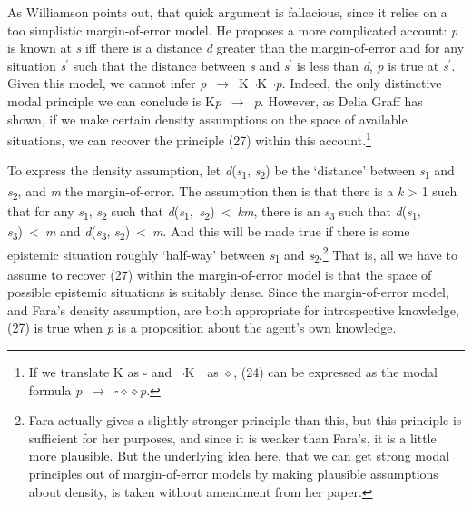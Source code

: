 As Williamson points out, that quick argument is fallacious, since it relies on a too simplistic margin-of-error model. He proposes a more complicated account: \textit{p} is known at \textit{s} iff there is a distance \textit{d} greater than the margin-of-error and for any situation \textit{s}\(^\prime\) such that the distance between \textit{s} and \textit{s}\(^\prime\) is less than \textit{d},\textit{ p} is true at \textit{s}\(^\prime\). Given this model, we cannot infer \textit{p}~${\rightarrow}$~K\(\neg\)K\(\neg\)\textit{p}. Indeed, the only distinctive modal principle we can conclude is K\textit{p}~${\rightarrow}$~\textit{p}. However, as Delia Graff \citet{Fara2002} has shown, if we make certain density assumptions on the space of available situations, we can recover the principle (27) within this account.\footnote{If we translate K as $\square $ and \(\neg\)K\(\neg\) as \(\diamond\), (24) can be expressed as the modal formula \textit{p}~${\rightarrow}$~$\square $\(\diamond\)\(\diamond\)\textit{p}.}


\noindent To express the density assumption, let \textit{d}(\textit{s}\textsubscript{1}, \textit{s}\textsubscript{2}) be the `distance' between \textit{s}\textsubscript{1} and \textit{s}\textsubscript{2}, and \textit{m} the margin-of-error. The assumption then is that there is a \textit{k} {\textgreater} 1 such that for any \textit{s}\textsubscript{1}, \textit{s}\textsubscript{2} such that \textit{d}(\textit{s}\textsubscript{1},~\textit{s}\textsubscript{2})~{\textless}~\textit{km}, there is an \textit{s}\textsubscript{3} such that \textit{d}(\textit{s}\textsubscript{1}, \textit{s}\textsubscript{3})~{\textless}~\textit{m} and \textit{d}(\textit{s}\textsubscript{3}, \textit{s}\textsubscript{2})~{\textless}~\textit{m}. And this will be made true if there is some epistemic situation roughly `half-way' between \textit{s}\textsubscript{1} and \textit{s}\textsubscript{2}.\footnote{Fara actually gives a slightly stronger principle than this, but this principle is sufficient for her purposes, and since it is weaker than Fara's, it is a little more plausible. But the underlying idea here, that we can get strong modal principles out of margin-of-error models by making plausible assumptions about density, is taken without amendment from her paper.} That is, all we have to assume to recover (27) within the margin-of-error model is that the space of possible epistemic situations is suitably dense. Since the margin-of-error model, and Fara's density assumption, are both appropriate for introspective knowledge, (27) is true when \textit{p} is a proposition about the agent's own knowledge. 

